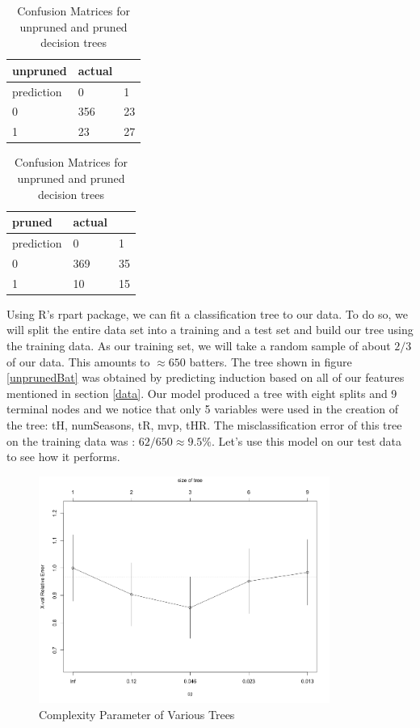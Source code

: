 \documentclass[preprint,12pt]{elsarticle}
\begin{document}
 \begin{table}[h]
\centering
\begin{tabular}{|l |l l|}
\hline
 unpruned &  actual & \\
\hline
prediction & 0 & 1 \\
0 & 356 & 23 \\
1 & 23 & 27 \\
\hline
\end{tabular}
\quad
\begin{tabular}{|l |l l|}
\hline
 pruned &  actual & \\
\hline
prediction & 0 & 1 \\
0 & 369 & 35 \\
1 & 10 & 15 \\
\hline
\end{tabular}
\caption{Confusion Matrices for unpruned and pruned decision trees}
\label{conf}
\end{table}

Using R's rpart package, we can fit a classification tree to our data. To do so, we will split the entire data set into a training and a test set and build our tree using the training data. As our training set, we will take a random sample of about $2/3$ of our data. This amounts to $\approx 650$ batters. The tree shown in figure \ref{unprunedBat} was obtained by predicting induction based on all of our features mentioned in section \ref{data}. Our model produced a tree with eight splits and 9 terminal nodes and we notice that only 5 variables were used in the creation of the tree: tH, numSeasons, tR, mvp, tHR. The misclassification error of this tree on the training data was : $62/650 \approx 9.5\%$. Let's use this model on our test data to see how it performs.




\begin{figure}[h]
       \centering 
       \includegraphics[width=0.85\textwidth]{PlotCP}
       \caption{Complexity Parameter of Various Trees}
       \label{CPlot}
 \end{figure}
\end{document}

